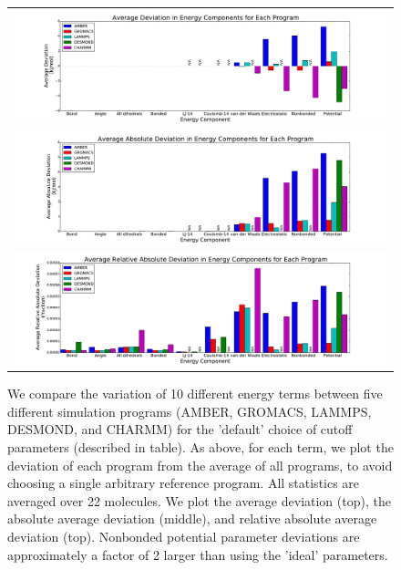 \begin{figure}[h]
\begin{tabular}{c}
\includegraphics[width=\textwidth]{AverageDefaultSettings.pdf} \\  
\includegraphics[width=\textwidth]{AverageAbsoluteDefaultSettings.pdf} \\  
\includegraphics[width=\textwidth]{AverageRelativeAbsoluteDefaultSettings.pdf}
\end{tabular}
\caption{We compare the variation of 10 different energy terms between
  five different simulation programs (AMBER, GROMACS, LAMMPS, DESMOND,
  and CHARMM) for the 'default' choice of cutoff parameters (described
  in table). As above, for each term, we plot the deviation of each
  program from the average of all programs, to avoid choosing a single
  arbitrary reference program. All statistics are averaged over 22
  molecules. We plot the average deviation (top), the absolute average
  deviation (middle), and relative absolute average deviation
  (top). Nonbonded potential parameter deviations are approximately a
  factor of 2 larger than using the 'ideal' parameters.
\label{fig:defaultfig}}
\end{figure}

